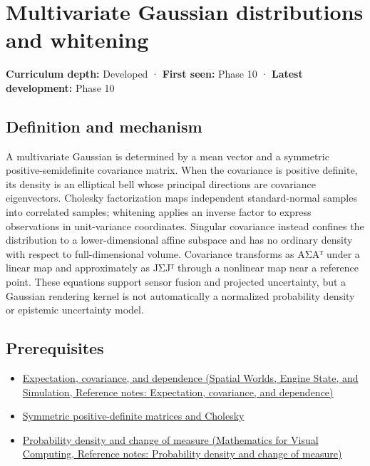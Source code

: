\hypertarget{appendix-12bbe185dbe5}{}\label{referencestart:appendix-12bbe185dbe5}
\section{Multivariate Gaussian distributions and whitening}\label{appendix-12bbe185dbe5-multivariate-gaussian-distributions-and-whitening}

\textbf{Curriculum depth:} Developed · \textbf{First seen:} Phase 10 · \textbf{Latest development:} Phase 10

\subsection{Definition and mechanism}\label{appendix-12bbe185dbe5-definition-and-mechanism}

A multivariate Gaussian is determined by a mean vector and a symmetric positive-semidefinite covariance matrix. When the covariance is positive definite, its density is an elliptical bell whose principal directions are covariance eigenvectors. Cholesky factorization maps independent standard-normal samples into correlated samples; whitening applies an inverse factor to express observations in unit-variance coordinates. Singular covariance instead confines the distribution to a lower-dimensional affine subspace and has no ordinary density with respect to full-dimensional volume. Covariance transforms as AΣAᵀ under a linear map and approximately as JΣJᵀ through a nonlinear map near a reference point. These equations support sensor fusion and projected uncertainty, but a Gaussian rendering kernel is not automatically a normalized probability density or epistemic uncertainty model.

\subsection{Prerequisites}\label{appendix-12bbe185dbe5-prerequisites}

\begin{itemize}
\tightlist
\item
  \href{../05-Spatial-Worlds-Engine-State-and-Simulation/main.pdf\#nameddest=appendix-54c383df9992}{Expectation, covariance, and dependence (Spatial Worlds, Engine State, and Simulation, Reference notes: Expectation, covariance, and dependence)}
\item
  \hyperref[appendix-50d2ea3c9b26]{Symmetric positive-definite matrices and Cholesky}
\item
  \href{../02-Mathematics-for-Visual-Computing/main.pdf\#nameddest=appendix-4815cd87ab8b}{Probability density and change of measure (Mathematics for Visual Computing, Reference notes: Probability density and change of measure)}
\end{itemize}

